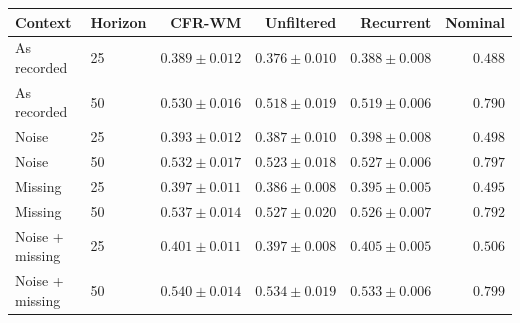 \begin{tabular}{llrrrr}
\toprule
Context & Horizon & CFR-WM & Unfiltered & Recurrent & Nominal \\
\midrule
As recorded & 25 & $0.389 \pm 0.012$ & $0.376 \pm 0.010$ & $0.388 \pm 0.008$ & $0.488$ \\
As recorded & 50 & $0.530 \pm 0.016$ & $0.518 \pm 0.019$ & $0.519 \pm 0.006$ & $0.790$ \\
Noise & 25 & $0.393 \pm 0.012$ & $0.387 \pm 0.010$ & $0.398 \pm 0.008$ & $0.498$ \\
Noise & 50 & $0.532 \pm 0.017$ & $0.523 \pm 0.018$ & $0.527 \pm 0.006$ & $0.797$ \\
Missing & 25 & $0.397 \pm 0.011$ & $0.386 \pm 0.008$ & $0.395 \pm 0.005$ & $0.495$ \\
Missing & 50 & $0.537 \pm 0.014$ & $0.527 \pm 0.020$ & $0.526 \pm 0.007$ & $0.792$ \\
Noise + missing & 25 & $0.401 \pm 0.011$ & $0.397 \pm 0.008$ & $0.405 \pm 0.005$ & $0.506$ \\
Noise + missing & 50 & $0.540 \pm 0.014$ & $0.534 \pm 0.019$ & $0.533 \pm 0.006$ & $0.799$ \\
\bottomrule
\end{tabular}

